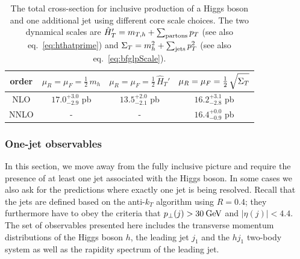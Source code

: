 \begin{table}
  \centering
  \begin{tabular}{c||c|c|c}
    order \vphantom{$\int\limits_a^b$} & $\mu_R=\mu_F=\tfrac{1}{2}\,m_h$ & $\mu_R=\mu_F=\tfrac{1}{2}\,\hat{H}_T'$ & $\mu_R=\mu_F=\tfrac{1}{2}\,\sqrt{\vphantom{\big[}\Sigma_T}$ \\
    \hline\hline
    NLO \vphantom{$\int\limits_a^b$}  & $17.0^{+3.0}_{-2.9}$ pb & $13.5^{+2.0}_{-2.1}$ pb & $16.2^{+3.1}_{-2.8}$ pb \\\hline
    NNLO \vphantom{$\int\limits_a^b$} & -     & -     & $16.4^{+0.0}_{-0.9}$ pb \\
    \hline
  \end{tabular}
  \caption{
    The total cross-section for inclusive production of a Higgs boson and 
    one additional jet using different core scale choices.  The two 
    dynamical scales are $\hat{H}_T'=m_{T,h} + \sum_{\rm partons} p_T$ 
    (see also eq.~\eqref{eq:hthatprime}) and 
    $\Sigma_T = m_h^2 + \sum_{\rm jets} p_T^2$ 
    (see also eq.~\eqref{eq:bfglpScale}).
  }
  \label{tab:H1jXS}
\end{table}


\subsubsection{One-jet observables}
\label{sec:hjetscomp:results:1jobs}

In this section, we move away from the fully inclusive picture and
require the presence of at least one jet associated with the Higgs
boson. In some cases we also ask for the predictions where exactly one
jet is being resolved. Recall that the jets are defined based on the
anti-$k_T$ algorithm using $R=0.4$; they furthermore have to obey the
criteria that $p_\perp(j)>30\text{\:GeV}$ and $|\eta(j)|<4.4$. The set of
observables presented here includes the transverse momentum
distributions of the Higgs boson $h$, the leading jet $j_1$ and the
$hj_1$ two-body system as well as the rapidity spectrum of the leading
jet.

